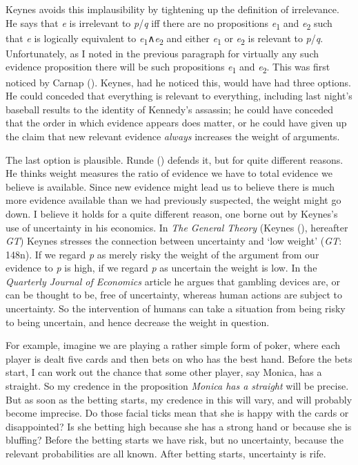 \documentclass[
  11pt,
  letterpaper,
  DIV=11,
  numbers=noendperiod,
  twoside]{scrartcl}
\begin{document}
Keynes avoids this implausibility by tightening up the definition of
irrelevance. He says that \emph{e} is irrelevant to \emph{p}/\emph{q}
iff there are no propositions \emph{e}\textsubscript{1} and
\emph{e}\textsubscript{2} such that \emph{e} is logically equivalent to
\emph{e}\textsubscript{1}∧\emph{e}\textsubscript{2} and either
\emph{e}\textsubscript{1} or \emph{e}\textsubscript{2} is relevant to
\emph{p}/\emph{q}. Unfortunately, as I noted in the previous paragraph
for virtually any such evidence proposition there will be such
propositions \emph{e}\textsubscript{1} and \emph{e}\textsubscript{2}.
This was first noticed by Carnap ().
Keynes, had he noticed this, would have had three options. He could
conceded that everything is relevant to everything, including last
night's baseball results to the identity of Kennedy's assassin; he could
have conceded that the order in which evidence appears does matter, or
he could have given up the claim that new relevant evidence
\emph{always} increases the weight of arguments.

The last option is plausible. Runde ()
defends it, but for quite different reasons. He thinks weight measures
the ratio of evidence we have to total evidence we believe is available.
Since new evidence might lead us to believe there is much more evidence
available than we had previously suspected, the weight might go down. I
believe it holds for a quite different reason, one borne out by Keynes's
use of uncertainty in his economics. In \emph{The General Theory}
(Keynes (), hereafter \emph{GT}) Keynes
stresses the connection between uncertainty and `low weight' (\emph{GT}:
148n). If we regard \emph{p} as merely risky the weight of the argument
from our evidence to \emph{p} is high, if we regard \emph{p} as
uncertain the weight is low. In the \emph{Quarterly Journal of
Economics} article he argues that gambling devices are, or can be
thought to be, free of uncertainty, whereas human actions are subject to
uncertainty. So the intervention of humans can take a situation from
being risky to being uncertain, and hence decrease the weight in
question.

For example, imagine we are playing a rather simple form of poker, where
each player is dealt five cards and then bets on who has the best hand.
Before the bets start, I can work out the chance that some other player,
say Monica, has a straight. So my credence in the proposition
\emph{Monica has a straight} will be precise. But as soon as the betting
starts, my credence in this will vary, and will probably become
imprecise. Do those facial ticks mean that she is happy with the cards
or disappointed? Is she betting high because she has a strong hand or
because she is bluffing? Before the betting starts we have risk, but no
uncertainty, because the relevant probabilities are all known. After
betting starts, uncertainty is rife.
\end{document}
